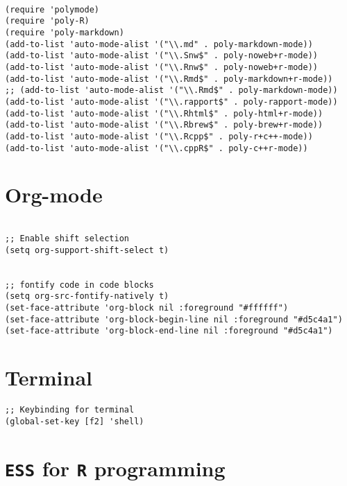 \documentclass[11pt]{article}
\begin{document}
\begin{verbatim}

(require 'polymode)
(require 'poly-R)
(require 'poly-markdown)
(add-to-list 'auto-mode-alist '("\\.md" . poly-markdown-mode))
(add-to-list 'auto-mode-alist '("\\.Snw$" . poly-noweb+r-mode))
(add-to-list 'auto-mode-alist '("\\.Rnw$" . poly-noweb+r-mode))
(add-to-list 'auto-mode-alist '("\\.Rmd$" . poly-markdown+r-mode))
;; (add-to-list 'auto-mode-alist '("\\.Rmd$" . poly-markdown-mode))
(add-to-list 'auto-mode-alist '("\\.rapport$" . poly-rapport-mode))
(add-to-list 'auto-mode-alist '("\\.Rhtml$" . poly-html+r-mode))
(add-to-list 'auto-mode-alist '("\\.Rbrew$" . poly-brew+r-mode))
(add-to-list 'auto-mode-alist '("\\.Rcpp$" . poly-r+c++-mode))
(add-to-list 'auto-mode-alist '("\\.cppR$" . poly-c++r-mode))

\end{verbatim}

\section{Org-mode}
\label{sec:org3615f16}
\begin{verbatim}

;; Enable shift selection
(setq org-support-shift-select t)


;; fontify code in code blocks
(setq org-src-fontify-natively t)
(set-face-attribute 'org-block nil :foreground "#ffffff")
(set-face-attribute 'org-block-begin-line nil :foreground "#d5c4a1")
(set-face-attribute 'org-block-end-line nil :foreground "#d5c4a1")

\end{verbatim}
\section{Terminal}
\label{sec:org1c58642}
\begin{verbatim}
;; Keybinding for terminal
(global-set-key [f2] 'shell)

\end{verbatim}
\section{\texttt{ESS} for \texttt{R} programming}
\label{sec:org5531610}
\end{document}
